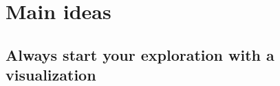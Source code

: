\documentclass[slidestop,compress,mathserif,12pt,t,professionalfonts,xcolor=table]{beamer}
\begin{document}











\section{Main ideas}


\subsection{Always start your exploration with a visualization}
\label{mi1}

\end{document}
